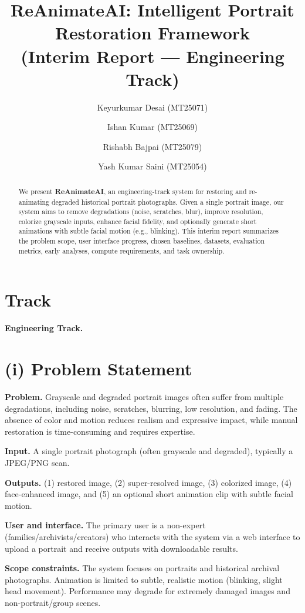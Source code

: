 \documentclass[10pt,twocolumn,letterpaper]{article}
\title{ReAnimateAI: Intelligent Portrait Restoration Framework\\(Interim Report --- Engineering Track)}
\author{
Keyurkumar Desai (MT25071) \and
Ishan Kumar (MT25069) \and
Rishabh Bajpai (MT25079) \and
Yash Kumar Saini (MT25054)
}
\date{}
\begin{document}
\maketitle

\begin{abstract}
We present \textbf{ReAnimateAI}, an engineering-track system for restoring and re-animating degraded historical portrait photographs. Given a single portrait image, our system aims to remove degradations (noise, scratches, blur), improve resolution, colorize grayscale inputs, enhance facial fidelity, and optionally generate short animations with subtle facial motion (e.g., blinking). This interim report summarizes the problem scope, user interface progress, chosen baselines, datasets, evaluation metrics, early analyses, compute requirements, and task ownership.
\end{abstract}

\section{Track}
\textbf{Engineering Track.}

\section{(i) Problem Statement}
\textbf{Problem.} Grayscale and degraded portrait images often suffer from multiple degradations, including noise, scratches, blurring, low resolution, and fading. The absence of color and motion reduces realism and expressive impact, while manual restoration is time-consuming and requires expertise.

\textbf{Input.} A single portrait photograph (often grayscale and degraded), typically a JPEG/PNG scan.

\textbf{Outputs.} (1) restored image, (2) super-resolved image, (3) colorized image, (4) face-enhanced image, and (5) an optional short animation clip with subtle facial motion.

\textbf{User and interface.} The primary user is a non-expert (families/archivists/creators) who interacts with the system via a web interface to upload a portrait and receive outputs with downloadable results.

\textbf{Scope constraints.} The system focuses on portraits and historical archival photographs. Animation is limited to subtle, realistic motion (blinking, slight head movement). Performance may degrade for extremely damaged images and non-portrait/group scenes.
\end{document}

